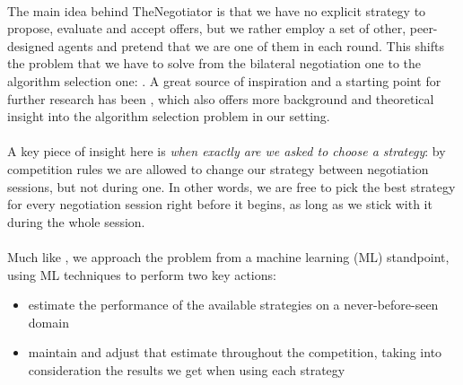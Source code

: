 \paragraph*{}
The main idea behind TheNegotiator is that we have no explicit strategy to propose, evaluate and accept offers, but we rather employ a set of other, peer-designed agents and pretend that we are one of them in each round. %
This shifts the problem that we have to solve from the bilateral negotiation one to the algorithm selection one:  \cite{original_alg_selection_paper_1975}. A great source of inspiration and a starting point for further research has been \cite{meta_agent_paper}, which also offers more background and theoretical insight into the algorithm selection problem in our setting.

\paragraph*{}
A key piece of insight here is \emph{when exactly are we asked to choose a strategy}: by competition rules we are allowed to change our strategy between negotiation sessions, but not during one.
In other words, we are free to pick the best strategy for every negotiation session right before it begins, as long as we stick with it during the whole session.

\paragraph*{}
Much like \cite{meta_agent_paper}, we approach the problem from a machine learning (ML) standpoint, using ML techniques to perform two key actions:
\begin{itemize}
    \item estimate the performance of the available strategies on a never-before-seen domain
    \item maintain and adjust that estimate throughout the competition, taking into consideration the results we get when using each strategy
\end{itemize}

